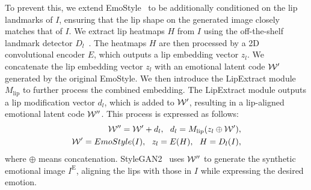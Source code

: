 To prevent this, we extend EmoStyle~\cite{azari2024emostyle} to be additionally conditioned on the lip landmarks of $I$, ensuring that the lip shape on the generated image closely matches that of $I$. We extract lip heatmaps $H$ from $I$ using the off-the-shelf landmark detector $D_l$~\cite{bulat2017far}. The heatmaps $H$ are then processed by a 2D convolutional encoder $E$, which outputs a lip embedding vector $z_l$. We concatenate the lip embedding vector $z_l$ with an emotional latent code $\mathcal{W}'$ generated by the original EmoStyle. We then introduce the LipExtract module $M_\text{lip}$ to further process the combined embedding. The LipExtract module outputs a lip modification vector $d_l$, which is added to $\mathcal{W}'$, resulting in a lip-aligned emotional latent code $\mathcal{W}''$. This process is expressed as follows:
\begin{eqnarray}
    \mathcal{W}'' = \mathcal{W}' + d_l, \ \ d_l = M_\text{lip}(z_l \oplus \mathcal{W}'), \nonumber \\
    \mathcal{W}' = EmoStyle(I), \ \ z_l = E(H), \ \ H = D_l(I), 
\end{eqnarray}
where $\oplus$ means concatenation. StyleGAN2~\cite{karras2020analyzing} uses $\mathcal{W}''$ to generate the synthetic emotional image $I^\text{E}$, aligning the lips with those in $I$ while expressing the desired emotion.


